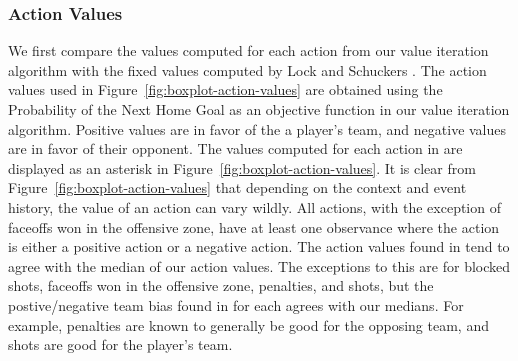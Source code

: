 \documentclass[]{article}
\begin{document}
\subsubsection{Action Values}

We first compare the values computed for each action from our value iteration algorithm with the fixed values computed by Lock and Schuckers \citep{Lock2009,Schuckers2011}. The action values used in Figure~\ref{fig:boxplot-action-values} are obtained using the Probability of the Next Home Goal as an objective function in our value iteration algorithm. Positive values are in favor of the a player's team, and negative values are in favor of their opponent. The values computed for each action in \citep{Lock2009} are displayed as an asterisk in Figure~\ref{fig:boxplot-action-values}. It is clear from Figure~\ref{fig:boxplot-action-values} that depending on the context and event history, the value of an action can vary wildly. All actions, with the exception of faceoffs won in the offensive zone, have at least one observance where the action is either a positive action or a negative action. The action values found in \citep{Lock2009} tend to agree with the median of our action values. The exceptions to this are for blocked shots, faceoffs won in the offensive zone, penalties, and shots, but the postive/negative team bias found in \citep{Lock2009} for each agrees with our medians. For example, penalties are known to generally be good for the opposing team, and shots are good for the player's team.
\end{document}
